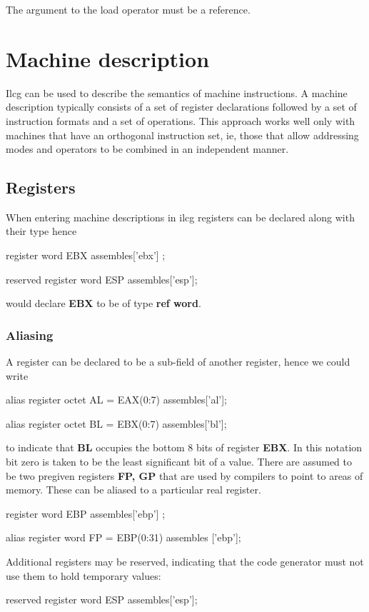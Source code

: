 {{{}
The argument to the load operator must be a reference.

\section{Machine description}
Ilcg can be used to describe the semantics of machine instructions.
A machine description typically consists of a set of register declarations
followed by a set of instruction formats and a set of operations.
This approach works well only with machines that have an orthogonal
instruction set, ie, those that allow addressing modes and operators
to be combined in an independent manner.
\subsection{Registers }
When entering machine descriptions in ilcg registers can be declared
along with their type hence
{\bf

register word EBX assembles['ebx'] ;

reserved register word ESP assembles['esp'];
 

}
would declare {\bf EBX} to be of type {\bf ref word}.

\subsubsection{Aliasing}
A register can be declared to be a sub-field of another register,
hence we could write 
{\bf

 alias register octet AL = EAX(0:7) assembles['al']; 

 alias register octet BL = EBX(0:7) assembles['bl'];


}
to indicate that {\bf BL} occupies the bottom 8 bits of register {\bf EBX}.
In this notation bit zero is taken to be the least significant bit of a value.
There are assumed to be two pregiven registers {\bf FP, GP} that
are used by compilers to point to  areas of memory.
These can be aliased to a particular real register.{\bf

register word EBP assembles['ebp'] ;

alias register word FP = EBP(0:31) assembles ['ebp'];

}

Additional registers may be reserved, indicating that the code generator
must not use them to hold temporary values:

{\bf

reserved register word ESP assembles['esp'];
}
 
}}
